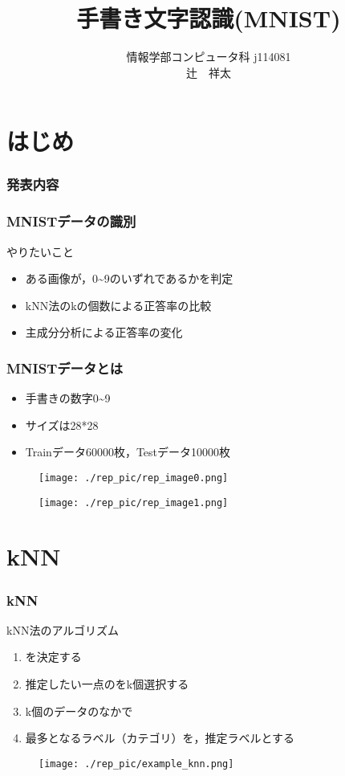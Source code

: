 \documentclass[dvipdfmx]{beamer}
\title{手書き文字認識(MNIST)}
\institute{工学院大学}
\author{情報学部コンピュータ科 j114081 \\ 辻　祥太}
\date{}
\begin{document}
\section*{はじめ}
\begin{frame}
  \titlepage
\end{frame}

\begin{frame}[plain]
  \frametitle{発表内容}
  \tableofcontents
\end{frame}

\begin{frame}
  \frametitle{MNISTデータの識別}
  やりたいこと
  \begin{itemize}
    \item ある画像が，0\textasciitilde9のいずれであるかを判定
    \item kNN法のkの個数による正答率の比較
    \item 主成分分析による正答率の変化
  \end{itemize}
\end{frame}

\begin{frame}
  \frametitle{MNISTデータとは}
  \begin{itemize}
    \item 手書きの数字0\textasciitilde9
    \item サイズは28*28
    \item Trainデータ60000枚，Testデータ10000枚
  \end{itemize}
  \begin{figure}
    \centering
    \begin{minipage}{0.4\columnwidth}
      \centering
      \texttt{[image: ./rep\_pic/rep\_image0.png]}
    \end{minipage}
    \begin{minipage}{0.4\columnwidth}
      \centering
      \texttt{[image: ./rep\_pic/rep\_image1.png]}
    \end{minipage}
  \end{figure}
\end{frame}

\section{kNN}
\begin{frame}
  \frametitle{kNN}
  kNN法のアルゴリズム
  \begin{enumerate}
    \item {}を決定する
    \item 推定したい一点のをk個選択する
    \item k個のデータのなかで
    \item 最多となるラベル（カテゴリ）を，推定ラベルとする
  \end{enumerate}
  \begin{center}
    \begin{figure}
      \texttt{[image: ./rep\_pic/example\_knn.png]}
    \end{figure}
  \end{center}
\end{frame}
\end{document}
